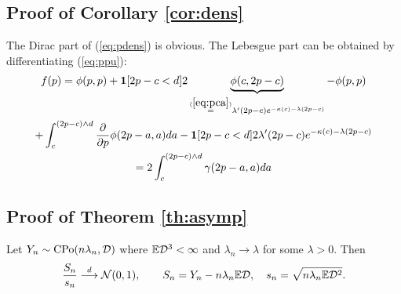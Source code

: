 \documentclass{aptpub}
\begin{document}



\subsection{Proof of Corollary \ref{cor:dens}}
\label{app:dens}


The Dirac part of (\ref{eq:pdens}) is obvious. The Lebesgue part can be obtained by  differentiating (\ref{eq:ppu}):
\begin{multline}
f(p) = \phi(p,p)+\mathbf{1}[2p-c < d]2 \underbrace{\phi(c,2p-c)}_{\stackrel{(\ref{eq:pca})}=\lambda'(2p-c)e^{-\kappa(c)-\lambda(2p-c)}}-\phi(p,p)
\\+
\int_c^{(2p-c)\wedge d}\frac{\partial}{\partial p}\phi(2p-a,a)da
-\mathbf{1}[2p-c < d]2\lambda'(2p-c)e^{-\kappa(c)-\lambda(2p-c)}
\\
=2\int_c^{(2p-c)\wedge d}\gamma(2p-a,a)da
\end{multline}

\subsection{Proof of Theorem \ref{th:asymp}}
\label{app:asymp}

\begin{lemma}\label{lem:pois}
Let $Y_n \sim \mathrm{CPo}(n\lambda_n,\mathcal{D})$ 
where $\mathbb{E} \mathcal{D}^3 < \infty$ and $\lambda_n \rightarrow \lambda$ for some $\lambda > 0$. Then
$$
\frac{S_n}{s_n} \stackrel{d}\longrightarrow \mathcal{N}(0,1), \qquad S_n=Y_n - n\lambda_n \mathbb{E} \mathcal{D},\quad s_n = \sqrt{n \lambda_n \mathbb{E} \mathcal{D}^2}.
$$
\end{lemma}
\end{document}
